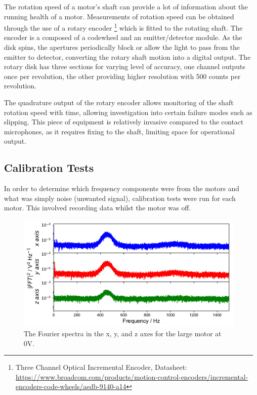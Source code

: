 The rotation speed of a motor's shaft can provide a lot of information about the running health of a motor. Measurements of rotation speed can be obtained through the use of a rotary encoder \footnote{Three Channel Optical Incremental Encoder, Datasheet: \url{https://www.broadcom.com/products/motion-control-encoders/incremental-encoders-code-wheels/aedb-9140-a14}} which is fitted to the rotating shaft. The encoder is a composed of a codewheel and an emitter/detector module. As the disk spins, the apertures periodically block or allow the light to pass from the emitter to detector, converting the rotary shaft motion into a digital output. The rotary disk has three sections for varying level of accuracy, one channel outputs once per revolution, the other providing higher resolution with 500 counts per revolution.

The quadrature output of the rotary encoder allows monitoring of the shaft rotation speed with time, allowing investigation into certain failure modes such as slipping. This piece of equipment is relatively invasive compared to the contact microphones, as it requires fixing to the shaft, limiting space for operational output. 


\subsection{Calibration Tests}

In order to determine which frequency components were from the motors and what was simply noise (unwanted signal), calibration tests were run for each motor. This involved recording data whilst the motor was off. 

\begin{figure}[t]
    \includegraphics[width=1.0\textwidth]{fig/freq_large_0V.pdf}
    \caption[Calibration Frequency 1]{The Fourier spectra in the x, y, and z axes for the large motor at 0V.}
    \label{fig:freq_large0V}
\end{figure}

